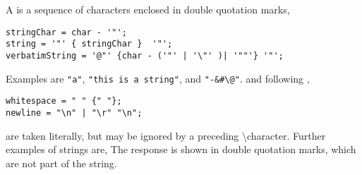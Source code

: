 A  is a sequence of characters enclosed in double quotation marks,
%
\begin{lstlisting}[language=ebnf]
stringChar = char - '"';
string = '"' { stringChar }  '"';
verbatimString = '@"' {char - ('"' | '\"' )| '""'} '"';
\end{lstlisting}
% 
Examples are \lstinline{"a"}, \lstinline{"this is a string"}, and \lstinline{"-&#\@"}.  and following ,
\begin{lstlisting}[language=ebnf,label=newlineNWhitespace]
whitespace = " " {" "};
newline = "\n" | "\r" "\n";
\end{lstlisting}
are taken literally, but may be ignored by a preceding \textbackslash character. Further examples of strings are,
%
%
The response is shown in double quotation marks, which are not part of the string. 

